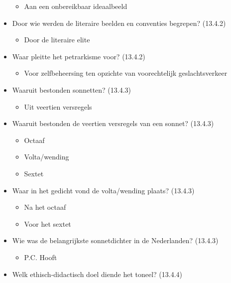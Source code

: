 \begin{itemize}
  \begin{itemize}
  \itemsep1pt\parskip0pt
  \item
    Aan een onbereikbaar ideaalbeeld
  \end{itemize}
\item
  Door wie werden de literaire beelden en conventies begrepen? (13.4.2)

  \begin{itemize}
  \itemsep1pt\parskip0pt
  \item
    Door de literaire elite
  \end{itemize}
\item
  Waar pleitte het petrarkisme voor? (13.4.2)

  \begin{itemize}
  \itemsep1pt\parskip0pt
  \item
    Voor zelfbeheersing ten opzichte van voorechtelijk geslachtsverkeer
  \end{itemize}
\item
  Waaruit bestonden sonnetten? (13.4.3)

  \begin{itemize}
  \itemsep1pt\parskip0pt
  \item
    Uit veertien versregels
  \end{itemize}
\item
  Waaruit bestonden de veertien versregels van een sonnet? (13.4.3)

  \begin{itemize}
  \itemsep1pt\parskip0pt
  \item
    Octaaf
  \item
    Volta/wending
  \item
    Sextet
  \end{itemize}
\item
  Waar in het gedicht vond de volta/wending plaats? (13.4.3)

  \begin{itemize}
  \itemsep1pt\parskip0pt
  \item
    Na het octaaf
  \item
    Voor het sextet
  \end{itemize}
\item
  Wie was de belangrijkste sonnetdichter in de Nederlanden? (13.4.3)

  \begin{itemize}
  \itemsep1pt\parskip0pt
  \item
    P.C. Hooft
  \end{itemize}
\item
  Welk ethisch-didactisch doel diende het toneel? (13.4.4)


\end{itemize}
